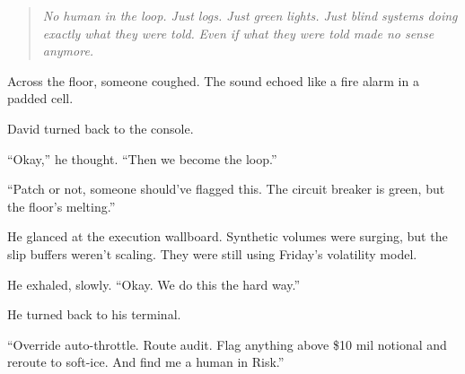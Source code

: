 \begin{quote}
\textit{No human in the loop. Just logs. Just green lights. Just blind systems doing exactly what they were told.} 
\textit{Even if what they were told made no sense anymore.}
\end{quote}

Across the floor, someone coughed. The sound echoed like a fire alarm in a padded cell.

David turned back to the console.

``Okay,'' he thought. ``Then we become the loop.''

“Patch or not, someone should’ve flagged this. The circuit breaker is green, but the floor’s melting.”

He glanced at the execution wallboard. Synthetic volumes were surging, but the slip buffers weren’t scaling. They 
were still using Friday’s volatility model.

He exhaled, slowly. “Okay. We do this the hard way.”

He turned back to his terminal.

“Override auto-throttle. Route audit. Flag anything above \$10 mil notional and reroute to soft-ice. And find 
me a human in Risk.”

\medskip

